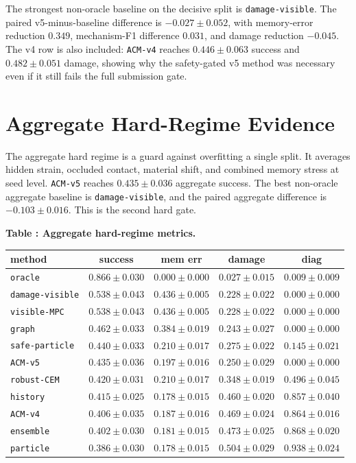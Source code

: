 \documentclass{article}
\begin{document}
The strongest non-oracle baseline on the decisive split is \texttt{damage-visible}. The paired v5-minus-baseline difference is $-0.027 \pm 0.052$, with memory-error reduction $0.349$, mechanism-F1 difference $0.031$, and damage reduction $-0.045$. The v4 row is also included: \texttt{ACM-v4} reaches $0.446 \pm 0.063$ success and $0.482 \pm 0.051$ damage, showing why the safety-gated v5 method was necessary even if it still fails the full submission gate.

\section{Aggregate Hard-Regime Evidence}
The aggregate hard regime is a guard against overfitting a single split. It averages hidden strain, occluded contact, material shift, and combined memory stress at seed level. \texttt{ACM-v5} reaches $0.435 \pm 0.036$ aggregate success. The best non-oracle aggregate baseline is \texttt{damage-visible}, and the paired aggregate difference is $-0.103 \pm 0.016$. This is the second hard gate.

\scriptsize
\setlength{\tabcolsep}{2pt}
\begin{center}
\label{tab:aggregate}\textbf{Table \thetable: Aggregate hard-regime metrics.}\\[0.4ex]
\begin{tabular}{lcccc}
\toprule
method & success & mem err & damage & diag \\
\midrule
\texttt{oracle} & $0.866 \pm 0.030$ & $0.000 \pm 0.000$ & $0.027 \pm 0.015$ & $0.009 \pm 0.009$ \\
\texttt{damage-visible} & $0.538 \pm 0.043$ & $0.436 \pm 0.005$ & $0.228 \pm 0.022$ & $0.000 \pm 0.000$ \\
\texttt{visible-MPC} & $0.538 \pm 0.043$ & $0.436 \pm 0.005$ & $0.228 \pm 0.022$ & $0.000 \pm 0.000$ \\
\texttt{graph} & $0.462 \pm 0.033$ & $0.384 \pm 0.019$ & $0.243 \pm 0.027$ & $0.000 \pm 0.000$ \\
\texttt{safe-particle} & $0.440 \pm 0.033$ & $0.210 \pm 0.017$ & $0.275 \pm 0.022$ & $0.145 \pm 0.021$ \\
\texttt{ACM-v5} & $0.435 \pm 0.036$ & $0.197 \pm 0.016$ & $0.250 \pm 0.029$ & $0.000 \pm 0.000$ \\
\texttt{robust-CEM} & $0.420 \pm 0.031$ & $0.210 \pm 0.017$ & $0.348 \pm 0.019$ & $0.496 \pm 0.045$ \\
\texttt{history} & $0.415 \pm 0.025$ & $0.178 \pm 0.015$ & $0.460 \pm 0.020$ & $0.857 \pm 0.040$ \\
\texttt{ACM-v4} & $0.406 \pm 0.035$ & $0.187 \pm 0.016$ & $0.469 \pm 0.024$ & $0.864 \pm 0.016$ \\
\texttt{ensemble} & $0.402 \pm 0.030$ & $0.181 \pm 0.015$ & $0.473 \pm 0.025$ & $0.868 \pm 0.020$ \\
\texttt{particle} & $0.386 \pm 0.030$ & $0.178 \pm 0.015$ & $0.504 \pm 0.029$ & $0.938 \pm 0.024$ \\
\bottomrule
\end{tabular}
\end{center}
\normalsize
\end{document}
